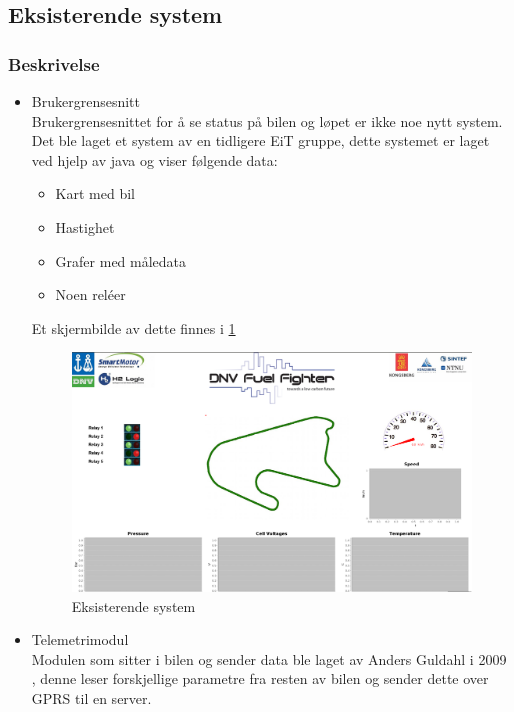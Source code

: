 \subsection{Eksisterende system}
\subsubsection{Beskrivelse}
\begin{itemize}
\item Brukergrensesnitt \\
Brukergrensesnittet for å se status på bilen og løpet er ikke noe nytt system. 
Det ble laget et system av en tidligere EiT gruppe, dette systemet er laget ved hjelp av java og viser følgende data:
\begin{itemize}
\item Kart med bil
\item Hastighet
\item Grafer med måledata
\item Noen reléer
\end{itemize}
Et skjermbilde av dette finnes i \ref{ekssys}
\\
\begin{figure}[H]
\label{ekssys}
\includegraphics[width=\textwidth]{images/java.png}
\caption{Eksisterende system} 
\end{figure}
\item Telemetrimodul \\
Modulen som sitter i bilen og sender data ble laget av Anders Guldahl i 2009 \cite{telemetrithesis}, denne leser forskjellige parametre fra resten av bilen og sender dette over GPRS til en server.
\end{itemize}
